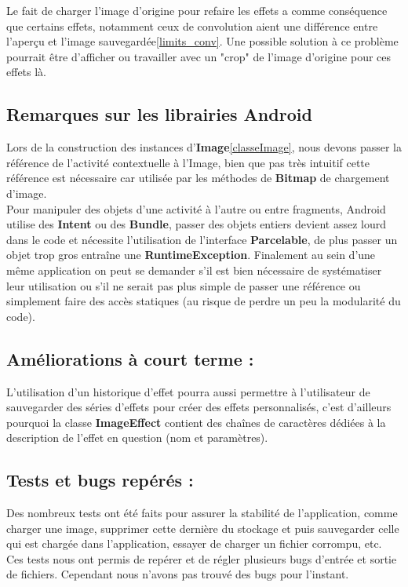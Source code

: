 Le fait de charger l'image d'origine pour refaire les effets a comme conséquence que certains effets, notamment ceux de convolution aient une différence entre l'aperçu et l'image sauvegardée\ref{limits_conv}. Une possible solution à ce problème pourrait être d'afficher ou travailler avec un "crop" de l'image d'origine pour ces effets là.
\\

\subsection{Remarques sur les librairies Android}
Lors de la construction des instances d'\textbf{Image}\ref{classeImage}, nous devons passer la référence de l'activité contextuelle à l'Image, bien que pas très intuitif cette référence est nécessaire car utilisée par les méthodes de \textbf{Bitmap} de chargement d'image.
\\

\label{parcelable}
Pour manipuler des objets d'une activité à l'autre ou entre fragments, Android utilise des \textbf{Intent} ou des \textbf{Bundle}, passer des objets entiers devient assez lourd dans le code et nécessite l'utilisation de l'interface \textbf{Parcelable}, de plus passer un objet trop gros entraîne une \textbf{RuntimeException}. Finalement au sein d'une même application on peut se demander s'il est bien nécessaire de systématiser leur utilisation ou s'il ne serait pas plus simple de passer une référence ou simplement faire des accès statiques (au risque de perdre un peu la modularité du code).

\subsection{Améliorations à court terme :}

L'utilisation d'un historique d'effet pourra aussi permettre à l'utilisateur de sauvegarder des séries d'effets pour créer des effets personnalisés, c'est d'ailleurs pourquoi la classe \textbf{ImageEffect} contient des chaînes de caractères dédiées à la description de l'effet en question (nom et paramètres).

\subsection{Tests et bugs repérés :}
Des nombreux tests ont été faits pour assurer la stabilité de l'application, comme charger une image, supprimer cette dernière du stockage et puis sauvegarder celle qui est chargée dans l'application, essayer de charger un fichier corrompu, etc. Ces tests nous ont permis de repérer et de régler plusieurs bugs d'entrée et sortie de fichiers. Cependant nous n'avons pas trouvé des bugs pour l'instant.

